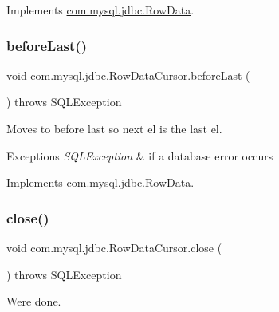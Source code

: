 Implements \mbox{\hyperlink{interfacecom_1_1mysql_1_1jdbc_1_1_row_data_a3c1836b8c63ae7d859b8b0f1613ef244}{com.\+mysql.\+jdbc.\+Row\+Data}}.

\mbox{\label{classcom_1_1mysql_1_1jdbc_1_1_row_data_cursor_ad4fae6a3882e5973545d91ff6069e92b}} 
\subsubsection{\texorpdfstring{before\+Last()}{beforeLast()}}
{\footnotesize\ttfamily void com.\+mysql.\+jdbc.\+Row\+Data\+Cursor.\+before\+Last (\begin{DoxyParamCaption}{ }\end{DoxyParamCaption}) throws S\+Q\+L\+Exception}

Moves to before last so next el is the last el.


\begin{DoxyExceptions}{Exceptions}
{\em S\+Q\+L\+Exception} & if a database error occurs \\
\hline
\end{DoxyExceptions}


Implements \mbox{\hyperlink{interfacecom_1_1mysql_1_1jdbc_1_1_row_data_a64bc800ad28a97c6ad1f7d6a4958c187}{com.\+mysql.\+jdbc.\+Row\+Data}}.

\mbox{\label{classcom_1_1mysql_1_1jdbc_1_1_row_data_cursor_a8ffbd795d22ff847acae23bb8c51ea08}} 
\subsubsection{\texorpdfstring{close()}{close()}}
{\footnotesize\ttfamily void com.\+mysql.\+jdbc.\+Row\+Data\+Cursor.\+close (\begin{DoxyParamCaption}{ }\end{DoxyParamCaption}) throws S\+Q\+L\+Exception}

We\textquotesingle{}re done.


